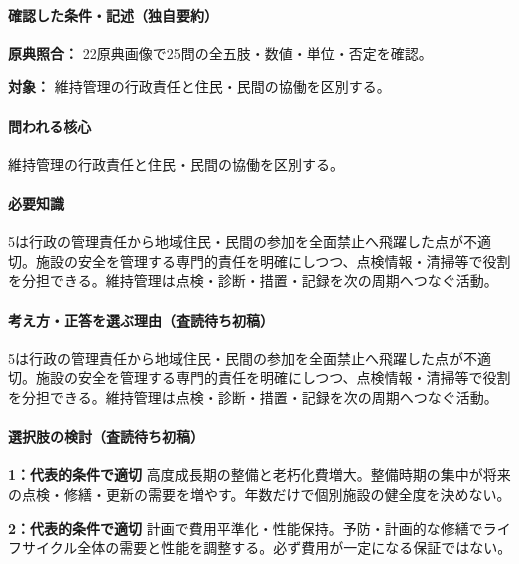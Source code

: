 \paragraph{確認した条件・記述（独自要約）}\mbox{}\par

\noindent\textbf{原典照合：} 22原典画像で25問の全五肢・数値・単位・否定を確認。\par

\noindent\textbf{対象：} 維持管理の行政責任と住民・民間の協働を区別する。\par

\paragraph{問われる核心} 維持管理の行政責任と住民・民間の協働を区別する。

\paragraph{必要知識} 5は行政の管理責任から地域住民・民間の参加を全面禁止へ飛躍した点が不適切。施設の安全を管理する専門的責任を明確にしつつ、点検情報・清掃等で役割を分担できる。維持管理は点検・診断・措置・記録を次の周期へつなぐ活動。

\paragraph{考え方・正答を選ぶ理由（査読待ち初稿）} 5は行政の管理責任から地域住民・民間の参加を全面禁止へ飛躍した点が不適切。施設の安全を管理する専門的責任を明確にしつつ、点検情報・清掃等で役割を分担できる。維持管理は点検・診断・措置・記録を次の周期へつなぐ活動。

\paragraph{選択肢の検討（査読待ち初稿）}\mbox{}\par

\noindent\textbf{1：代表的条件で適切} 高度成長期の整備と老朽化費増大。整備時期の集中が将来の点検・修繕・更新の需要を増やす。年数だけで個別施設の健全度を決めない。\par

\noindent\textbf{2：代表的条件で適切} 計画で費用平準化・性能保持。予防・計画的な修繕でライフサイクル全体の需要と性能を調整する。必ず費用が一定になる保証ではない。\par

